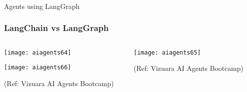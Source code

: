 \begin{frame}[fragile]\frametitle{}
\begin{center}
{\Large Agents using LangGraph}
\end{center}
\end{frame}

\begin{frame}[fragile]\frametitle{LangChain vs LangGraph}
\begin{columns}
    \begin{column}[T]{0.6\linewidth}
        \begin{center}
        \texttt{[image: aiagents64]}
		
        \texttt{[image: aiagents66]}
		
		{\tiny (Ref: Vizuara AI Agents Bootcamp)}
				
        \end{center}    
    \end{column}
    \begin{column}[T]{0.4\linewidth}
        \begin{center}
        \texttt{[image: aiagents65]}
		
		{\tiny (Ref: Vizuara AI Agents Bootcamp)}
				
        \end{center}    
    \end{column}
  \end{columns}
\end{frame}


